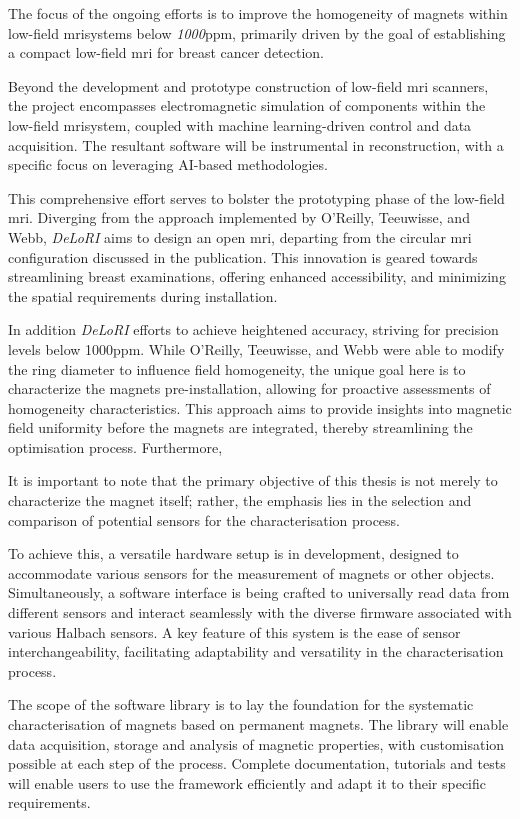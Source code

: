The focus of the ongoing efforts is to improve the homogeneity of
magnets within low-field \gls{mri}systems below \emph{1000}\gls{ppm},
primarily driven by the goal of establishing a compact low-field
\gls{mri} for breast cancer detection.

Beyond the development and prototype construction of low-field \gls{mri}
scanners, the project encompasses electromagnetic simulation of
components within the low-field \gls{mri}system, coupled with machine
learning-driven control and data acquisition. The resultant software
will be instrumental in reconstruction, with a specific focus on
leveraging AI-based methodologies.

This comprehensive effort serves to bolster the prototyping phase of the
low-field \gls{mri}. Diverging from the approach implemented by
O'Reilly, Teeuwisse, and Webb, \emph{DeLoRI} aims to design an open
\gls{mri}, departing from the circular \gls{mri} configuration discussed
in the publication. This innovation is geared towards streamlining
breast examinations, offering enhanced accessibility, and minimizing the
spatial requirements during installation.

In addition \emph{DeLoRI} efforts to achieve heightened accuracy,
striving for precision levels below 1000\gls{ppm}. While O'Reilly,
Teeuwisse, and Webb were able to modify the ring diameter to influence
field homogeneity, the unique goal here is to characterize the magnets
pre-installation, allowing for proactive assessments of homogeneity
characteristics. This approach aims to provide insights into magnetic
field uniformity before the magnets are integrated, thereby streamlining
the optimisation process. Furthermore,

It is important to note that the primary objective of this thesis is not
merely to characterize the magnet itself; rather, the emphasis lies in
the selection and comparison of potential sensors for the
characterisation process.

To achieve this, a versatile hardware setup is in development, designed
to accommodate various sensors for the measurement of magnets or other
objects. Simultaneously, a software interface is being crafted to
universally read data from different sensors and interact seamlessly
with the diverse firmware associated with various Halbach sensors. A key
feature of this system is the ease of sensor interchangeability,
facilitating adaptability and versatility in the characterisation
process.

The scope of the software library is to lay the foundation for the
systematic characterisation of magnets based on permanent magnets. The
library will enable data acquisition, storage and analysis of magnetic
properties, with customisation possible at each step of the process.
Complete documentation, tutorials and tests will enable users to use the
framework efficiently and adapt it to their specific requirements.

